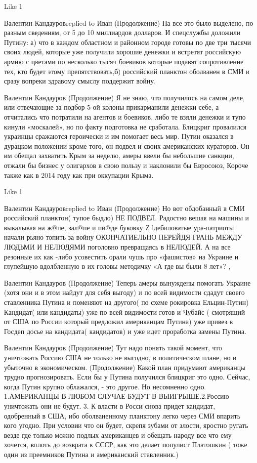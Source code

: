     Like 1

Валентин Кандауровreplied to Иван
(Продолжение) На все это было выделено, по разным сведениям, от 5 до 10 миллиардов долларов. И спецслужбы доложили Путину: а) что в каждом областном и районном городе готовы по две три тысячи своих людей, которые уже получили хорошие денежки и встретят российскую армию с цветами по несколько тысяч боевиков которые подавят сопротивление тех, кто будет этому препятствовать,б) российский планктон оболванен в СМИ и сразу вопреки здравому смыслу поддержит войну.

Валентин Кандауров
(Продолжение) Я не знаю, что получилось на самом деле, или отвечающие за подбор 5-ой колоны прикарманили денежки себе, а отчитались что потратили на агентов и боевиков, либо те взяли денежки и тупо кинули «москалей», но по факту подготовка не сработала. Блицкриг провалился украинцы сражаются героически и им помогает весь мир. Путин оказался в дурацком положении кроме того, он подвел и своих американских кураторов. Он им обещал захватить Крым за неделю, амеры ввели бы небольшие санкции, отжали бы бизнес у олигархов в свою пользу и наклонили бы Евросоюз, Короче также как в 2014 году как при оккупации Крыма.

    Like 1

Валентин Кандауровreplied to Иван
(Продолжение) Но вот обдобанный в СМИ российский планктон( тупое быдло) НЕ ПОДВЕЛ. Радостно вешая на машины и выкалывая на ж@пе, зал@пе и пи@де буковку Z lдебиловатые ура-патриоты начали рьяно топить за войну ОКОНЧАТИЕЛЬНО ПЕРЕЙДЯ ГРАНЬ МЕЖДУ ЛЮДЬМИ И НЕЛЮДЯМИ поголовно превращаясь в НЕЛЮДЕЙ. А на все резонные их как -либо усовестить орали чушь про «фашистов» на Украине и глупейшую вдолбленную в их головы методичку «А где вы были 8 лет»? ,

Валентин Кандауров
(Продолжение) Теперь амеры вынуждены помогать Украине (хотя они и в этом найдут для себя выгоду) и по всей видимости сдадут своего ставленника Путина и поменяют на другого( по схеме рокировка Ельцин-Путин) Кандидат( или кандидаты) уже по всей видимости готов и Чубайс ( смотрящий от США по России который предложил американцам Путина) уже привез в Госдеп досье на кандидата( кандидатов) и уже идет проработка замены Путина.

Валентин Кандауров
(Продолжение) Тут надо понять такой момент, что уничтожать Россию США не только не выгодно, в политическом плане, но и убыточно в экономическом. (Продолжение) Какой план придумают американцы трудно прогнозировать. Если бы у Путина получился блицкриг это одно. Сейчас, когда Путин крупно облажался, - это другое. Но несомненно одно. 1.АМЕРИКАНЦЫ В ЛЮБОМ СЛУЧАЕ БУДУТ В ВЫИГРЫШЕ.2.Россию уничтожать они не будут. 3. К власти в Росси снова придет кандидат, одобренный в США, ибо оболваненному планктону легко через СМИ впарить кого угодно. При условии что он будет, скрепя зубами от злости, яростно ругать везде где только можно подлых американцев и обещать народу все что ему хочется, вплоть до возврата к СССР, как это делает популист Платошкин ( тоже один из преемников Путина и американский ставленник.)

